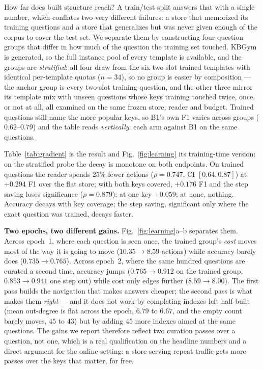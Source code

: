 \documentclass[conference]{IEEEtran}
\newcommand{\kbgym}{KBGym}
\begin{document}
How far does built structure reach? A train/test split answers that with a
single number, which conflates two very different failures: a store that
memorized its training questions and a store that generalizes but was never
given enough of the corpus to cover the test set. We separate them by
constructing four question groups that differ in how much of the question
the training set touched. \kbgym{} is generated, so the full instance pool
of every template is available, and the groups are \emph{stratified}: all
four draw from the six two-slot trained templates with identical
per-template quotas ($n{=}34$), so no group is easier by composition ---
the anchor group is every two-slot training question, and the other three
mirror its template mix with unseen questions whose keys training touched
twice, once, or not at all, all examined on the same frozen store, reader
and budget. Trained questions still name the more popular keys, so B1's
own F1 varies across groups ($0.62$--$0.79$) and the table reads
\emph{vertically}: each arm against B1 on the same questions.

Table~\ref{tab:gradient} is the result and Fig.~\ref{fig:learning} its
training-time version: on the stratified probe the decay is monotone on
both endpoints. On trained questions the reader spends $25\%$ fewer
actions ($\rho = 0.747$, CI $[0.64, 0.87]$) at $+0.294$ F1 over the flat
store; with both keys covered, $+0.176$ F1 and the step saving loses
significance ($\rho = 0.879$); at one key $+0.059$; at none, nothing.
Accuracy decays with key coverage; the step saving, significant only
where the exact question was trained, decays faster.

\textbf{Two epochs, two different gains.} Fig.~\ref{fig:learning}a--b
separates them. Across epoch~1, where each question is seen once, the
trained group's \emph{cost} moves most of the way it is going to move
($10.35 \to 8.59$ actions) while accuracy barely does ($0.735 \to 0.765$).
Across epoch~2, where the same hundred questions are curated a second
time, accuracy jumps ($0.765 \to 0.912$ on the trained group,
$0.853 \to 0.941$ one step out) while cost only edges further
($8.59 \to 8.00$). The first pass builds the navigation that makes
answers cheaper; the second pass is what makes them \emph{right} --- and
it does not work by completing indexes left half-built (mean out-degree is
flat across the epoch, $6.79$ to $6.67$, and the empty count barely moves,
$45$ to $43$) but by adding $45$ more indexes aimed at the same questions.
The gains we report therefore reflect two curation passes over a question,
not one, which is a real qualification on the headline numbers and a
direct argument for the online setting: a store serving repeat traffic
gets more passes over the keys that matter, for free.
\end{document}
